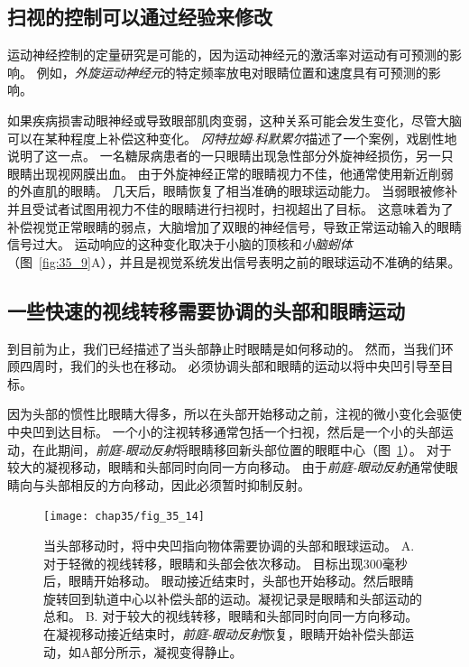 \subsection{扫视的控制可以通过经验来修改}

运动神经控制的定量研究是可能的，因为运动神经元的激活率对运动有可预测的影响。
例如，\textit{外旋运动神经元}的特定频率放电对眼睛位置和速度具有可预测的影响。


如果疾病损害动眼神经或导致眼部肌肉变弱，这种关系可能会发生变化，尽管大脑可以在某种程度上补偿这种变化。
\textit{冈特拉姆$\cdot$科默累尔}描述了一个案例，戏剧性地说明了这一点。
一名糖尿病患者的一只眼睛出现急性部分外旋神经损伤，另一只眼睛出现视网膜出血。
由于外旋神经正常的眼睛视力不佳，他通常使用新近削弱的外直肌的眼睛。
几天后，眼睛恢复了相当准确的眼球运动能力。
当弱眼被修补并且受试者试图用视力不佳的眼睛进行扫视时，扫视超出了目标。
这意味着为了补偿视觉正常眼睛的弱点，大脑增加了双眼的神经信号，导致正常运动输入的眼睛信号过大。
运动响应的这种变化取决于小脑的顶核和\textit{小脑蚓体}（图~\ref{fig:35_9}A），并且是视觉系统发出信号表明之前的眼球运动不准确的结果。



\subsection{一些快速的视线转移需要协调的头部和眼睛运动}

到目前为止，我们已经描述了当头部静止时眼睛是如何移动的。
然而，当我们环顾四周时，我们的头也在移动。
必须协调头部和眼睛的运动以将中央凹引导至目标。


因为头部的惯性比眼睛大得多，所以在头部开始移动之前，注视的微小变化会驱使中央凹到达目标。
一个小的注视转移通常包括一个扫视，然后是一个小的头部运动，在此期间，\textit{前庭-眼动反射}将眼睛移回新头部位置的眼眶中心（图~\ref{fig:35_14}）。
对于较大的凝视移动，眼睛和头部同时向同一方向移动。
由于\textit{前庭-眼动反射}通常使眼睛向与头部相反的方向移动，因此必须暂时抑制反射。


\begin{figure}[htbp]
	\centering
	\texttt{[image: chap35/fig\_35\_14]}
	\caption{当头部移动时，将中央凹指向物体需要协调的头部和眼球运动。
		A. 对于轻微的视线转移，眼睛和头部会依次移动。
		目标出现300毫秒后，眼睛开始移动。
		眼动接近结束时，头部也开始移动。然后眼睛旋转回到轨道中心以补偿头部的运动。凝视记录是眼睛和头部运动的总和\cite{zee1977disorders}。
		B. 对于较大的视线转移，眼睛和头部同时向同一方向移动。
		在凝视移动接近结束时，\textit{前庭-眼动反射}恢复，眼睛开始补偿头部运动，如A部分所示，凝视变得静止\cite{laurutis1986vestibulo}。}
	\label{fig:35_14}
\end{figure}



